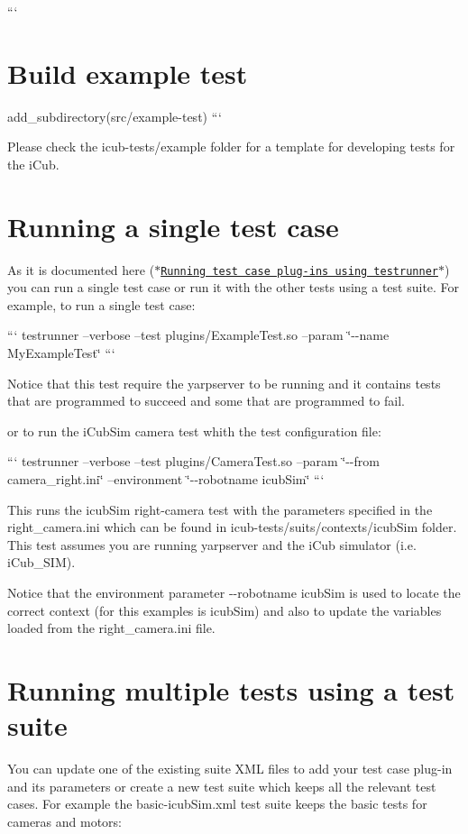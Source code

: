 ``` \section*{Build example test}

add\-\_\-subdirectory(src/example-\/test) ```

Please check the {\ttfamily icub-\/tests/example} folder for a template for developing tests for the i\-Cub.\hypertarget{writing-and-running_running_single_test_case}{}\section{Running a single test case}\label{writing-and-running_running_single_test_case}
As it is documented here (\href{http://robotology.github.io/robot-testing/documentation/testrunner.html}{\tt $\ast$\-Running test case plug-\/ins using testrunner$\ast$}) you can run a single test case or run it with the other tests using a test suite. For example, to run a single test case\-:

``` testrunner --verbose --test plugins/\-Example\-Test.\-so --param \char`\"{}-\/-\/name My\-Example\-Test\char`\"{} ```

Notice that this test require the {\ttfamily yarpserver} to be running and it contains tests that are programmed to succeed and some that are programmed to fail.

or to run the i\-Cub\-Sim camera test whith the test configuration file\-:

``` testrunner --verbose --test plugins/\-Camera\-Test.\-so --param \char`\"{}-\/-\/from camera\-\_\-right.\-ini\char`\"{} --environment \char`\"{}-\/-\/robotname icub\-Sim\char`\"{} ```

This runs the icub\-Sim right-\/camera test with the parameters specified in the {\ttfamily right\-\_\-camera.\-ini} which can be found in {\ttfamily icub-\/tests/suits/contexts/icub\-Sim} folder. This test assumes you are running {\ttfamily yarpserver} and the i\-Cub simulator (i.\-e. {\ttfamily i\-Cub\-\_\-\-S\-I\-M}).

Notice that the environment parameter {\ttfamily -\/-\/robotname icub\-Sim} is used to locate the correct context (for this examples is {\ttfamily icub\-Sim}) and also to update the variables loaded from the {\ttfamily right\-\_\-camera.\-ini} file.\hypertarget{writing-and-running_running_multiple_tests}{}\section{Running multiple tests using a test suite}\label{writing-and-running_running_multiple_tests}
You can update one of the existing suite X\-M\-L files to add your test case plug-\/in and its parameters or create a new test suite which keeps all the relevant test cases. For example the {\ttfamily basic-\/icub\-Sim.\-xml} test suite keeps the basic tests for cameras and motors\-:

